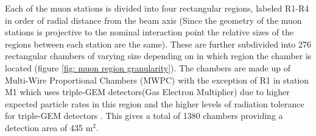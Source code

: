 Each of the muon stations is divided into four rectangular regions, labeled R1-R4 in order of radial distance from the beam axis (Since the geometry of the muon stations is projective to the nominal interaction point the relative sizes of the regions between each station are the same). These are further subdivided into 276 rectangular chambers of varying size depending on in which region the chamber is located (figure \ref{fig: muon region granularity}). The chambers are made up of Multi-Wire Proportional Chambers (MWPC) with the exception of R1 in station M1 which uses triple-GEM detectors(Gas Electron Multiplier) due to higher expected particle rates in this region and the higher levels of radiation tolerance for triple-GEM detectors \cite{muon-second-addemdum}. This gives a total of 1380 chambers providing a detection area of 435 m$^2$.


